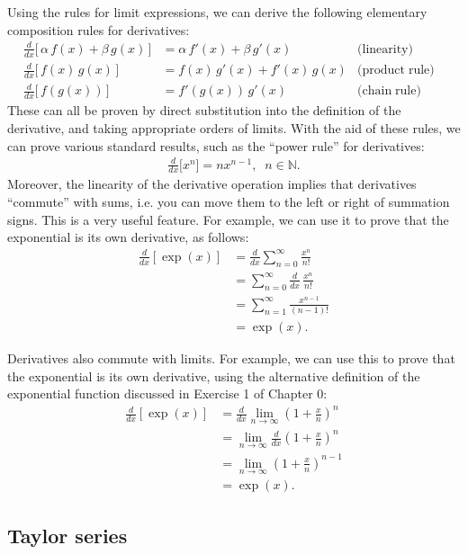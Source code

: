 \documentclass[10pt,a4paper]{article}
\begin{document}
Using the rules for limit expressions, we can derive the following
elementary composition rules for derivatives:
\begin{align}
  \frac{d}{dx}\big[\,\alpha\, f(x) + \beta\, g(x)\,\big] &= \alpha\, f'(x) + \beta\, g'(x) \quad &\textrm{(linearity)}& \\   \frac{d}{dx}\big[\,f(x) \, g(x)\,\big] &= f(x) \, g'(x) + f'(x) \, g(x) &\textrm{(product}\;\textrm{rule)}& \\   \frac{d}{dx}\big[\,f(g(x))\,\big] &= f'(g(x)) \, g'(x) &\textrm{(chain}\;\textrm{rule)}&
\end{align}
These can all be proven by direct substitution into the definition of
the derivative, and taking appropriate orders of limits.  With the aid
of these rules, we can prove various standard results, such as the
``power rule'' for derivatives:
\begin{align}
  \frac{d}{dx} \big[x^n\big] = n x^{n-1}, \;\;n \in \mathbb{N}.
\end{align}
Moreover, the linearity of the derivative operation implies that
derivatives ``commute'' with sums, i.e. you can move them to the left
or right of summation signs. This is a very useful feature. For
example, we can use it to prove that the exponential is its own
derivative, as follows:
\begin{align}
  \frac{d}{dx} \left[\exp(x)\right] &= \frac{d}{dx} \sum_{n=0}^\infty\frac{x^n}{n!} \\
  &= \sum_{n=0}^\infty\frac{d}{dx} \, \frac{x^n}{n!} \\
  &= \sum_{n=1}^\infty \frac{x^{n-1}}{(n-1)!} \\
  &=\exp(x).
\end{align}

Derivatives also commute with limits.  For example, we can use this to
prove that the exponential is its own derivative, using the
alternative definition of the exponential function discussed in
Exercise 1 of Chapter 0:
\begin{align}
  \frac{d}{dx} \left[\exp(x)\right] &= \frac{d}{dx} \lim_{n\rightarrow\infty} \left(1+\frac{x}{n}\right)^n \\
  &= \lim_{n\rightarrow\infty} \frac{d}{dx} \left(1+\frac{x}{n}\right)^n \\
  &= \lim_{n\rightarrow\infty} \left(1+\frac{x}{n}\right)^{n-1} \\
  &= \exp(x).
\end{align}

\subsection{Taylor series}\label{taylor-series}
\end{document}
